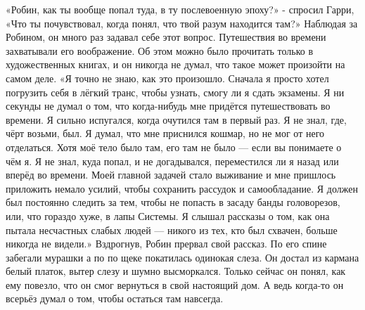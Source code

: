 \documentclass[a4paper,12pt]{book}
\begin{document}
	«Робин, как ты вообще попал туда, в ту послевоенную эпоху?» - спросил Гарри,
	«Что ты почувствовал, когда понял, что твой разум находится там?»
	Наблюдая за Робином, он много раз задавал себе этот вопрос. Путешествия во времени захватывали его воображение. Об этом можно было прочитать только в художественных книгах, и он никогда не думал, что такое может произойти на самом деле.
	«Я точно не знаю, как это произошло. Сначала я просто хотел погрузить себя в лёгкий транс, чтобы узнать, смогу ли я сдать экзамены. Я ни секунды не думал о том, что когда-нибудь мне придётся путешествовать во времени. Я сильно испугался, когда очутился там в первый раз. Я не знал, где, чёрт возьми, был. Я думал, что мне приснился кошмар, но не мог от него отделаться. Хотя моё тело было там, его там не было — если вы понимаете о чём я. Я не знал, куда попал, и не догадывался, переместился ли я назад или вперёд во времени. Моей главной задачей стало выживание и мне пришлось приложить немало усилий, чтобы сохранить рассудок и самообладание. Я должен был постоянно следить за тем, чтобы не попасть в засаду банды головорезов, или, что гораздо хуже, в лапы Системы. Я слышал рассказы о том, как она пытала несчастных слабых людей — никого из тех, кто был схвачен, больше никогда не видели.»
	Вздрогнув, Робин прервал свой рассказ. По его спине забегали мурашки а по по щеке покатилась одинокая слеза. Он достал из кармана белый платок, вытер слезу и шумно высморкался. Только сейчас он понял, как ему повезло, что он смог вернуться в свой настоящий дом. А ведь когда-то он всерьёз думал о том, чтобы остаться там навсегда.
\end{document}
